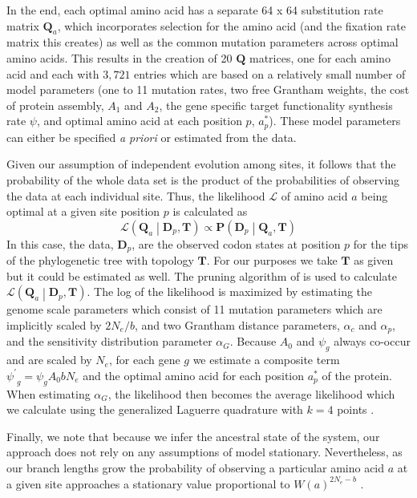 \documentclass[12pt,letterpaper]{article}
\newcommand{\Ne}{\ensuremath{{N_e}}\xspace} %
\newcommand{\Lik}{\ensuremath{\mathcal{L}}\xspace}%
\newcommand{\Pmatrix}{\ensuremath{\mathbf{P}}\xspace}
\newcommand{\Tmatrix}{\ensuremath{\mathbf{T}}\xspace}
\newcommand{\Dmatrixp}{\ensuremath{\mathbf{D}_p}\xspace}
\newcommand{\Qmatrix}{\ensuremath{\mathbf{Q}}\xspace}
\newcommand{\Qmatrixa}{\ensuremath{\Qmatrix_a}\xspace}
\newcommand{\alphac}{\ensuremath{\alpha_c}\xspace}
\newcommand{\alphag}{\ensuremath{\alpha_G}\xspace}
\newcommand{\alphap}{\ensuremath{\alpha_p}\xspace}
\newcommand{\aoptp}{\ensuremath{a^*_p}\xspace}
\newcommand{\psiprime}{\ensuremath{\psi^\prime}\xspace}
\begin{document}
In the end, each optimal amino acid has a separate 64 x 64 substitution rate matrix \Qmatrixa, which incorporates selection for the amino acid (and the fixation rate matrix this creates) as well as the common mutation parameters across optimal amino acids.
This results in the creation of 20 \Qmatrix matrices, one for each amino acid and each with $3,721$ entries which are based on a relatively small number of model parameters (one to 11 mutation rates, two free Grantham weights, the cost of protein assembly, $A_1$ and $A_2$, the gene specific target functionality synthesis rate $\psi$, and optimal amino acid at each position $p$, \aoptp).
These model parameters can either be specified \emph{a priori} or  estimated from the data.


Given our assumption of independent evolution among sites, it follows that the probability of the whole data set is the product of the probabilities of observing the data at each individual site.
Thus, the likelihood $\Lik$ of amino acid $a$ being optimal at a given site position $p$ is calculated as
\begin{equation}
\Lik\left(\Qmatrixa\middle| \Dmatrixp, \Tmatrix\right) \propto \Pmatrix\left(\Dmatrixp\middle|\Qmatrixa,\Tmatrix\right)
\end{equation}
In this case, the data, $\Dmatrixp$, are the observed codon states at position $p$ for the tips of the phylogenetic tree with topology $\Tmatrix$.
For our purposes we take \Tmatrix as given but it could be estimated as well.
The pruning algorithm of \citet{Felsenstein1981} is used to calculate $\Lik\left(\Qmatrixa \middle| \Dmatrixp, \Tmatrix\right)$.
The log of the likelihood is maximized by estimating the genome scale parameters which consist of 11 mutation parameters which are implicitly scaled by $2 \Ne/b$, and two Grantham distance parameters, $\alphac$ and $\alphap$, and the sensitivity distribution parameter \alphag.
Because $A_0$ and $\psi_g$ always co-occur and are scaled by \Ne, for each gene $g$ we estimate a composite term $\psiprime_g = \psi_g A_0 b \Ne$ and the optimal amino acid for each position \aoptp of the protein.
When estimating \alphag, the likelihood then becomes the average likelihood which we calculate using the generalized Laguerre quadrature with $k = 4$ points \citep{Felsenstein2001}.


Finally, we note that because we infer the ancestral state of the system, our approach does not rely on any assumptions of model stationary.
Nevertheless, as our branch lengths grow the probability of observing a particular amino acid $a$ at a given site approaches a stationary value proportional to $W(a)^{2 \Ne -b}$ \citep{SellaAndHirsh2005}.
\end{document}
